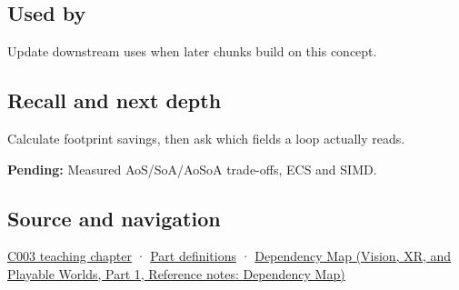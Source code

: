 \subsection{Used by}\label{appendix-5522ad176ca0-used-by}

\hypertarget{appendix-5522ad176ca0-used-by}{}

Update downstream uses when later chunks build on this concept.

\subsection{Recall and next depth}\label{appendix-5522ad176ca0-recall-and-next-depth}

\hypertarget{appendix-5522ad176ca0-recall-and-next-depth}{}

Calculate footprint savings, then ask which fields a loop actually reads.

\textbf{Pending:} Measured AoS/SoA/AoSoA trade-offs, ECS and SIMD.

\subsection{Source and navigation}\label{appendix-5522ad176ca0-source-and-navigation}

\hypertarget{appendix-5522ad176ca0-source-and-navigation}{}

\hyperref[01-foundations-i-ch002-where-the-bytes-live]{C003 teaching chapter} · \hyperref[appendix-fd090d982a15-m003---parts-41-60]{Part definitions} · \href{../07-Vision-XR-and-Playable-Worlds-P01/main.pdf\#nameddest=appendix-4ad47bdd269a}{Dependency Map (Vision, XR, and Playable Worlds, Part 1, Reference notes: Dependency Map)}
